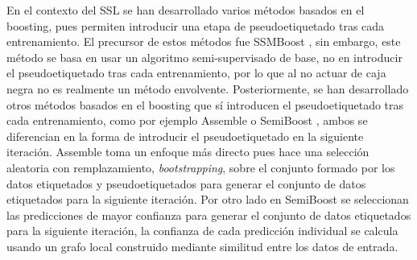 En el contexto del \gls{SSL} se han desarrollado varios métodos basados en el boosting, pues permiten introducir una etapa de pseudoetiquetado tras cada entrenamiento. El precursor de estos métodos fue SSMBoost \cite{grandvalet2001boosting}, sin embargo, este método se basa en usar un algoritmo semi-supervisado de base, no en introducir el pseudoetiquetado tras cada entrenamiento, por lo que al no actuar de caja negra no es realmente un método envolvente. Posteriormente, se han desarrollado otros métodos basados en el boosting que sí introducen el pseudoetiquetado tras cada entrenamiento, como por ejemplo Assemble \cite{bennett2002exploiting} o SemiBoost \cite{mallapragada2008semiboost}, ambos se diferencian en la forma de introducir el pseudoetiquetado en la siguiente iteración. Assemble toma un enfoque más directo pues hace una selección aleatoria con remplazamiento, \textit{bootstrapping}, sobre el conjunto formado por los datos etiquetados y pseudoetiquetados para generar el conjunto de datos etiquetados para la siguiente iteración. Por otro lado en SemiBoost se seleccionan las predicciones de mayor confianza para generar el conjunto de datos etiquetados para la siguiente iteración, la confianza de cada predicción individual se calcula usando un grafo local construido mediante similitud entre los datos de entrada.

